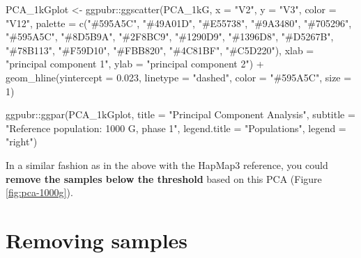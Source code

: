\documentclass[
]{book}
\newenvironment{Shaded}{\begin{snugshade}}{\end{snugshade}}
\newcommand{\AttributeTok}[1]{\textcolor[rgb]{0.77,0.63,0.00}{#1}}
\newcommand{\DecValTok}[1]{\textcolor[rgb]{0.00,0.00,0.81}{#1}}
\newcommand{\FloatTok}[1]{\textcolor[rgb]{0.00,0.00,0.81}{#1}}
\newcommand{\FunctionTok}[1]{\textcolor[rgb]{0.00,0.00,0.00}{#1}}
\newcommand{\NormalTok}[1]{#1}
\newcommand{\OtherTok}[1]{\textcolor[rgb]{0.56,0.35,0.01}{#1}}
\newcommand{\SpecialCharTok}[1]{\textcolor[rgb]{0.00,0.00,0.00}{#1}}
\newcommand{\StringTok}[1]{\textcolor[rgb]{0.31,0.60,0.02}{#1}}
\begin{document}
\begin{Shaded}
\begin{Highlighting}[]
\NormalTok{PCA\_1kGplot }\OtherTok{\textless{}{-}}\NormalTok{ ggpubr}\SpecialCharTok{::}\FunctionTok{ggscatter}\NormalTok{(PCA\_1kG, }\AttributeTok{x =} \StringTok{"V2"}\NormalTok{, }\AttributeTok{y =} \StringTok{"V3"}\NormalTok{,}
                                 \AttributeTok{color =} \StringTok{"V12"}\NormalTok{,}
                                 \AttributeTok{palette =} \FunctionTok{c}\NormalTok{(}\StringTok{"\#595A5C"}\NormalTok{, }\StringTok{"\#49A01D"}\NormalTok{, }\StringTok{"\#E55738"}\NormalTok{, }\StringTok{"\#9A3480"}\NormalTok{, }\StringTok{"\#705296"}\NormalTok{, }
                                             \StringTok{"\#595A5C"}\NormalTok{, }\StringTok{"\#8D5B9A"}\NormalTok{, }\StringTok{"\#2F8BC9"}\NormalTok{, }\StringTok{"\#1290D9"}\NormalTok{, }\StringTok{"\#1396D8"}\NormalTok{, }
                                             \StringTok{"\#D5267B"}\NormalTok{, }\StringTok{"\#78B113"}\NormalTok{, }\StringTok{"\#F59D10"}\NormalTok{, }\StringTok{"\#FBB820"}\NormalTok{, }\StringTok{"\#4C81BF"}\NormalTok{, }\StringTok{"\#C5D220"}\NormalTok{),}
                                 \AttributeTok{xlab =} \StringTok{"principal component 1"}\NormalTok{, }\AttributeTok{ylab =} \StringTok{"principal component 2"}\NormalTok{) }\SpecialCharTok{+}
  \FunctionTok{geom\_hline}\NormalTok{(}\AttributeTok{yintercept =} \FloatTok{0.023}\NormalTok{, }\AttributeTok{linetype =} \StringTok{"dashed"}\NormalTok{,}
                \AttributeTok{color =} \StringTok{"\#595A5C"}\NormalTok{, }\AttributeTok{size =} \DecValTok{1}\NormalTok{)}

\NormalTok{  ggpubr}\SpecialCharTok{::}\FunctionTok{ggpar}\NormalTok{(PCA\_1kGplot,}
                \AttributeTok{title =} \StringTok{"Principal Component Analysis"}\NormalTok{,}
                \AttributeTok{subtitle =} \StringTok{"Reference population: 1000 G, phase 1"}\NormalTok{,}
                \AttributeTok{legend.title =} \StringTok{"Populations"}\NormalTok{, }\AttributeTok{legend =} \StringTok{"right"}\NormalTok{)}
\end{Highlighting}
\end{Shaded}

In a similar fashion as in the above with the HapMap3 reference, you could \textbf{remove the samples below the threshold} based on this PCA (Figure \ref{fig:pca-1000g}).

\hypertarget{removing-samples}{%
\section{Removing samples}\label{removing-samples}}
\end{document}
